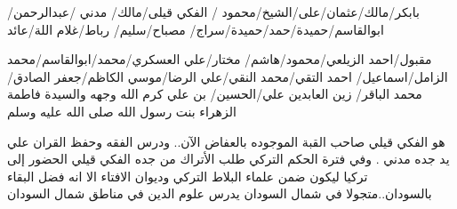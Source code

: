 \documentclass[12pt]{article}
\begin{document}
بابكر/مالك/عثمان/على/الشيخ/محمود
 / الفكي قيلى/مالك/  
مدني /عبدالرحمن/ابوالقاسم/حميدة/حمد/حميدة/سراج/ مصباح/سليم/ رباط/غلام اللة/عائد

مقبول/احمد الزيلعي/محمود/هاشم/ مختار/علي العسكري/محمد/ابوالقاسم/محمد الزامل/اسماعيل/ احمد التقي/محمد النقي/علي الرضا/موسي الكاظم/جعفر الصادق/ محمد الباقر/ زين العابدين علي/الحسين/ بن علي كرم الله وجهه والسيدة فاطمة الزهراء بنت رسول الله صلى الله عليه وسلم 


 
هو الفكي قيلي صاحب القبة الموجوده بالعفاض الآن.. ودرس الفقه وحفظ القران علي يد جده مدني . وفي فترة الحكم التركي طلب الأتراك من جده الفكي قيلي الحضور إلى تركيا ليكون ضمن علماء البلاط التركي وديوان الافتاء الا انه فضل البقاء بالسودان..متجولا في شمال السودان يدرس علوم الدين في مناطق شمال السودان
\end{document}
